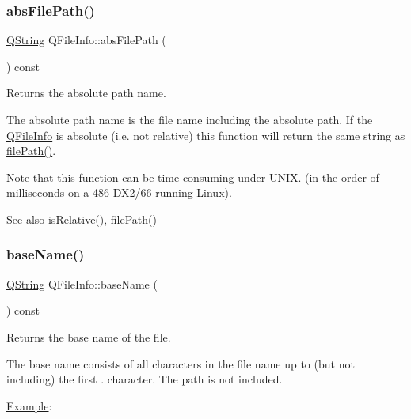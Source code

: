 \subsubsection{\texorpdfstring{absFilePath()}{absFilePath()}}
{\footnotesize\ttfamily \mbox{\hyperlink{class_q_string}{Q\+String}} Q\+File\+Info\+::abs\+File\+Path (\begin{DoxyParamCaption}{ }\end{DoxyParamCaption}) const}

Returns the absolute path name.

The absolute path name is the file name including the absolute path. If the \mbox{\hyperlink{class_q_file_info}{Q\+File\+Info}} is absolute (i.\+e. not relative) this function will return the same string as \mbox{\hyperlink{class_q_file_info_af3dc855c31853287a4f4a17a18d68bc2}{file\+Path()}}.

Note that this function can be time-\/consuming under U\+N\+IX. (in the order of milliseconds on a 486 D\+X2/66 running Linux).

\begin{DoxySeeAlso}{See also}
\mbox{\hyperlink{class_q_file_info_ae1b2d0ad6ca05510092d0182e276a5d0}{is\+Relative()}}, \mbox{\hyperlink{class_q_file_info_af3dc855c31853287a4f4a17a18d68bc2}{file\+Path()}} 
\end{DoxySeeAlso}
\mbox{\label{class_q_file_info_a17e986f20da0f2f8239fb99c5b6ecd27}} 
\subsubsection{\texorpdfstring{baseName()}{baseName()}}
{\footnotesize\ttfamily \mbox{\hyperlink{class_q_string}{Q\+String}} Q\+File\+Info\+::base\+Name (\begin{DoxyParamCaption}{ }\end{DoxyParamCaption}) const}

Returns the base name of the file.

The base name consists of all characters in the file name up to (but not including) the first \textquotesingle{}.\textquotesingle{} character. The path is not included.

\mbox{\hyperlink{struct_example}{Example}}\+: 
\begin{DoxyCode}{0}
\end{DoxyCode}


